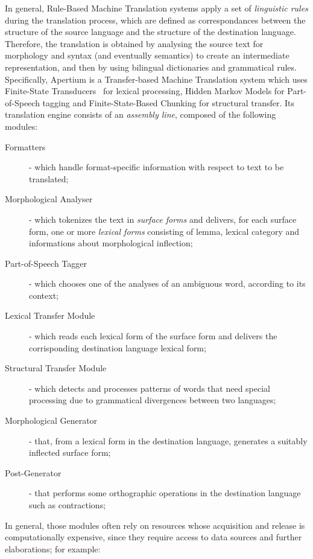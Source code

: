 \documentclass[11pt]{article}
\begin{document}
In general, Rule-Based Machine Translation systems apply a set of \emph{linguistic rules} during the translation process, which are defined as correspondances between the structure of the source language and the structure of the destination language. Therefore, the translation is obtained by analysing the source text for morphology and syntax (and eventually semantics) to create an intermediate representation, and then by using bilingual dictionaries and grammatical rules.\\

Specifically, Apertium is a Transfer-based Machine Translation system which uses Finite-State Transducers~\citep{fst} for lexical processing, Hidden Markov Models for Part-of-Speech tagging and Finite-State-Based Chunking for structural transfer. Its translation engine consists of an \emph{assembly line}, composed of the following modules:

\begin{description}
 \item[Formatters] - which handle format-specific information with respect to text to be translated;
 \item[Morphological Analyser] - which tokenizes the text in \emph{surface forms} and delivers, for each surface form, one or more \emph{lexical forms} consisting of lemma, lexical category and informations about morphological inflection;
 \item[Part-of-Speech Tagger] - which chooses one of the analyses of an ambiguous word, according to its context;
 \item[Lexical Transfer Module] - which reads each lexical form of the surface form and delivers the corrisponding destination language lexical form;
 \item[Structural Transfer Module] - which detects and processes patterns of words that need special processing due to grammatical divergences between two languages;
 \item[Morphological Generator] - that, from a lexical form in the destination language, generates a suitably inflected surface form;
 \item[Post-Generator] - that performs some orthographic operations in the destination language such as contractions;
\end{description}

In general, those modules often rely on resources whose acquisition and release is computationally expensive, since they require access to data sources and further elaborations; for example:
\end{document}
